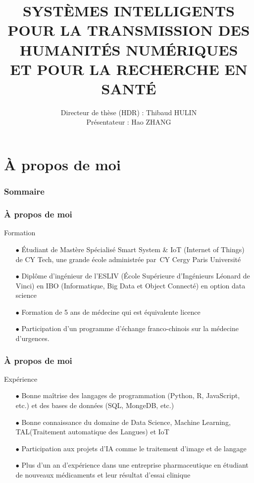 \documentclass[xcolor=dvipsnames]{beamer}
\title[SYSTÈMES INTELLIGENTS]{\textsc{SYSTÈMES INTELLIGENTS \\\normalsize{POUR LA TRANSMISSION DES \\HUMANITÉS NUMÉRIQUES \\ET POUR LA RECHERCHE EN SANTÉ}}}
\institute{\large{\texttt{LECLA}}}
\author{Directeur de thèse (HDR) : Thibaud HULIN
\\Présentateur : Hao ZHANG}
\date{\displaydate{date}}
\begin{document}
\begin{frame}
	\titlepage
\end{frame}

\section{À propos de moi}

\begin{frame}
	\frametitle{Sommaire}
	\tableofcontents[currentsection]
\end{frame}

\begin{frame}[fragile]
	\frametitle{À propos de moi}
		\begin{block}{Formation}
			\begin{itemize}
				\item[$\bullet$]Étudiant de Mastère Spécialisé Smart System \& IoT (Internet of Things) de CY Tech, une grande école administrée par CY Cergy Paris Université
				\item[$\bullet$]Diplôme d'ingénieur de l’ESLIV (École Supérieure d'Ingénieurs Léonard de Vinci) en IBO (Informatique, Big Data et Object Connecté) en option data science
				\item[$\bullet$]Formation de 5 ans de médecine qui est équivalente licence
				\item[$\bullet$]Participation d’un programme d’échange franco-chinois sur la médecine d’urgences.
			\end{itemize}
		\end{block}
\vspace{1.2cm}
\end{frame}

\begin{frame}[fragile]
\frametitle{À propos de moi}
\begin{block}{Expérience}
	\begin{itemize}
		\item[$\bullet$]Bonne maîtrise des langages de programmation (Python, R, JavaScript, etc.) et des bases de données (SQL, MongeDB, etc.)
		\item[$\bullet$]Bonne connaissance du domaine de Data Science, Machine Learning, TAL(Traitement automatique des Langues) et IoT
		\item[$\bullet$]Participation aux projets d’IA comme le traitement d’image et de langage
		\item[$\bullet$]Plus d’un an d’expérience dans une entreprise pharmaceutique en étudiant de nouveaux médicaments et leur résultat d’essai clinique
	\end{itemize}
\end{block}
\vspace{1.1cm}
\end{frame}
\end{document}

